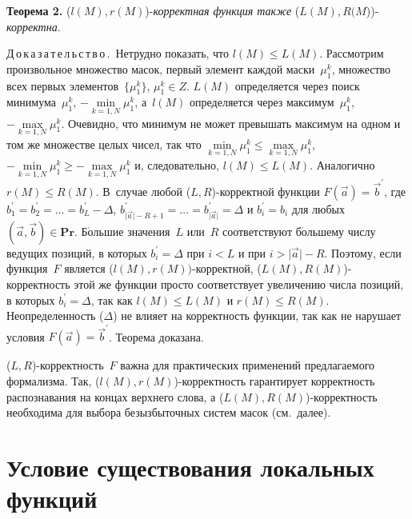 \begin{multicols}{2}
\medskip

\noindent
\textbf{Теорема 2.} ($l(M), r(M)$)-\textit{корректная функция также}  
($L(M), R(M$))-\textit{корректна}. 

\medskip

\noindent
Д\,о\,к\,а\,з\,а\,т\,е\,л\,ь\,с\,т\,в\,о\,.\ Нетрудно показать, что $l(M) \leq L(M)$. 
Рассмотрим произвольное множество масок, первый элемент каждой 
маски~$\mu_1^k$, множество всех первых элементов~$\{\mu_1^k\}$, 
$\mu_1^k\in Z$. $L(M)$ определяется через поиск минимума~$\mu_1^k$, $-
\underset{k=1,N}{\min} \mu_1^k$, а~$l(M)$ определяется через 
максимум~$\mu_1^k$, $-\underset{k=1,N}{\max} \mu_1^k$. Очевидно, что 
минимум не может превышать максимум на одном и том же множестве целых 
чисел, так что $\underset{k=1,N}{\min}\mu_1^k\leq 
\underset{k=1,N}{\max}\mu_1^k$, $-\underset{k=1,N}{\min}\mu_1^k \geq -
\underset{k=1,N}{\max}\mu_1^k$ и, следовательно, $l(M) \leq L(M)$. 
Аналогично $r(M) \leq R(M)$. В~случае любой ($L, R$)-кор\-рект\-ной функции 
$F\left(\vec{a}\right)=\vec{b}^\prime$, где $b_1^\prime =b_2^\prime=\ldots 
=b_L^\prime-\Delta$, $b^\prime_{\vert\vec{a}\vert -R+1}=\ldots 
=b^\prime_{\vert\vec{a}\vert}=\Delta$ и $b_i^\prime=b_i$ для любых 
$\left(\vec{a},\vec{b}\right)\in\mathbf{Pr}$. Б$\acute{\mbox{о}}$льшие 
значения~$L$ или~$R$ со\-от\-ветствуют б$\acute{\mbox{о}}$льшему числу 
ведущих позиций, в которых $b_i^\prime=\Delta$ при $i<L$ и при 
$i>\vert\vec{a}\vert -R$. Поэтому, если функция~$F$ является 
($l(M),r(M))$-кор\-рект\-ной, ($L(M),R(M)$)-кор\-рект\-ность этой же 
функции прос\-то соответствует увеличению числа позиций, в которых 
$b_i^\prime =\Delta$, так как $l(M) \leq L(M)$ и $r(M) \leq R(M)$. 
Неопределенность ($\Delta$) не влияет на корректность функции, так как не 
нарушает условия $F\left(\vec{a}\right)=\vec{b}^\prime$. Теорема до\-ка\-зана.

\medskip

    ($L,R$)-корректность~$F$ важна для практических применений 
предлагаемого формализма. Так, ($l(M),r(M)$)-кор\-рект\-ность гарантирует 
корректность распознавания на концах верхнего слова, а 
($L(M),R(M)$)-кор\-рект\-ность необходима для выбора безызбыточных сис\-тем 
масок (см.\ далее).

\section{Условие существования локальных функций}


\end{multicols}
